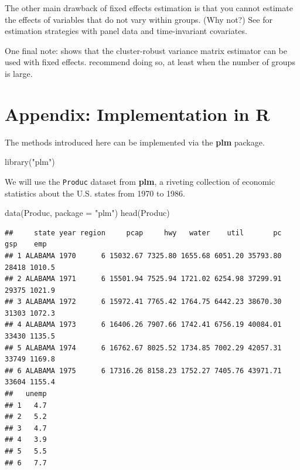 \documentclass[
  12pt,
  oneside,openany]{book}
\newenvironment{Shaded}{\begin{snugshade}}{\end{snugshade}}
\newcommand{\AttributeTok}[1]{\textcolor[rgb]{0.77,0.63,0.00}{#1}}
\newcommand{\FunctionTok}[1]{\textcolor[rgb]{0.00,0.00,0.00}{#1}}
\newcommand{\NormalTok}[1]{#1}
\newcommand{\StringTok}[1]{\textcolor[rgb]{0.31,0.60,0.02}{#1}}
\begin{document}
The other main drawback of fixed effects estimation is that you cannot estimate the effects of variables that do not vary within groups. (Why not?) See \citet[section 13.5]{greene} for estimation strategies with panel data and time-invariant covariates.

One final note: \citet{Arellano:1987jx} shows that the cluster-robust variance matrix estimator can be used with fixed effects. \citet{Cameron:2015ud} recommend doing so, at least when the number of groups is large.

\hypertarget{appendix-implementation-in-r-1}{%
\section{Appendix: Implementation in R}\label{appendix-implementation-in-r-1}}

The methods introduced here can be implemented via the \textbf{plm} package.

\begin{Shaded}
\begin{Highlighting}[]
\FunctionTok{library}\NormalTok{(}\StringTok{"plm"}\NormalTok{)}
\end{Highlighting}
\end{Shaded}

We will use the \texttt{Produc} dataset from \textbf{plm}, a riveting collection of economic statistics about the U.S. states from 1970 to 1986.

\begin{Shaded}
\begin{Highlighting}[]
\FunctionTok{data}\NormalTok{(Produc, }\AttributeTok{package =} \StringTok{"plm"}\NormalTok{)}
\FunctionTok{head}\NormalTok{(Produc)}
\end{Highlighting}
\end{Shaded}

\begin{verbatim}
##     state year region     pcap     hwy   water    util       pc   gsp    emp
## 1 ALABAMA 1970      6 15032.67 7325.80 1655.68 6051.20 35793.80 28418 1010.5
## 2 ALABAMA 1971      6 15501.94 7525.94 1721.02 6254.98 37299.91 29375 1021.9
## 3 ALABAMA 1972      6 15972.41 7765.42 1764.75 6442.23 38670.30 31303 1072.3
## 4 ALABAMA 1973      6 16406.26 7907.66 1742.41 6756.19 40084.01 33430 1135.5
## 5 ALABAMA 1974      6 16762.67 8025.52 1734.85 7002.29 42057.31 33749 1169.8
## 6 ALABAMA 1975      6 17316.26 8158.23 1752.27 7405.76 43971.71 33604 1155.4
##   unemp
## 1   4.7
## 2   5.2
## 3   4.7
## 4   3.9
## 5   5.5
## 6   7.7
\end{verbatim}
\end{document}
